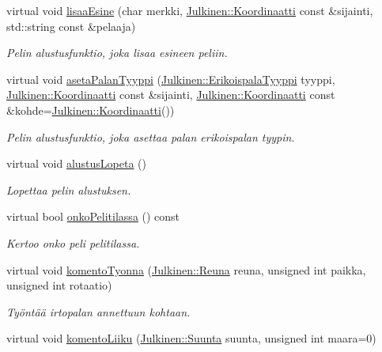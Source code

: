 \begin{DoxyCompactItemize}
virtual void \hyperlink{class_peli_a81f3587c603c96ddd127527f3772b19f}{lisaa\+Esine} (char merkki, \hyperlink{class_julkinen_1_1_koordinaatti}{Julkinen\+::\+Koordinaatti} const \&sijainti, std\+::string const \&pelaaja)
\begin{DoxyCompactList}\small\item\em Pelin alustusfunktio, joka lisaa esineen peliin. \end{DoxyCompactList}\item 
virtual void \hyperlink{class_peli_a8045f08b5aa05114baced0541142e735}{aseta\+Palan\+Tyyppi} (\hyperlink{namespace_julkinen_afc26052e09d0b2214f749492cc5fff19}{Julkinen\+::\+Erikoispala\+Tyyppi} tyyppi, \hyperlink{class_julkinen_1_1_koordinaatti}{Julkinen\+::\+Koordinaatti} const \&sijainti, \hyperlink{class_julkinen_1_1_koordinaatti}{Julkinen\+::\+Koordinaatti} const \&kohde=\hyperlink{class_julkinen_1_1_koordinaatti}{Julkinen\+::\+Koordinaatti}())
\begin{DoxyCompactList}\small\item\em Pelin alustusfunktio, joka asettaa palan erikoispalan tyypin. \end{DoxyCompactList}\item 
virtual void \hyperlink{class_peli_a65eff799de42881efc08f7994b27968e}{alustus\+Lopeta} ()
\begin{DoxyCompactList}\small\item\em Lopettaa pelin alustuksen. \end{DoxyCompactList}\item 
virtual bool \hyperlink{class_peli_a05f3cde8cc44cad1e083312d208721f3}{onko\+Pelitilassa} () const 
\begin{DoxyCompactList}\small\item\em Kertoo onko peli pelitilassa. \end{DoxyCompactList}\item 
virtual void \hyperlink{class_peli_a4093d9ae2c4b220a4da9bcc728f7d59b}{komento\+Tyonna} (\hyperlink{namespace_julkinen_acce0eefc4c90f907dd5fb319b0d05872}{Julkinen\+::\+Reuna} reuna, unsigned int paikka, unsigned int rotaatio)
\begin{DoxyCompactList}\small\item\em Työntää irtopalan annettuun kohtaan. \end{DoxyCompactList}\item 
virtual void \hyperlink{class_peli_ad721f34f1e12e0dae3e2f73de2d99d05}{komento\+Liiku} (\hyperlink{namespace_julkinen_a81b50e3c6f21c0c1c46e186592107c3c}{Julkinen\+::\+Suunta} suunta, unsigned int maara=0)

\end{DoxyCompactItemize}
